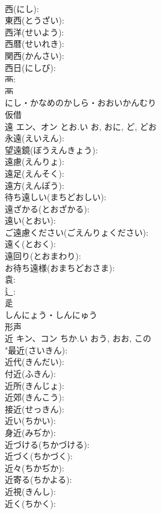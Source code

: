 \documentclass[8pt]{extreport}
\begin{document}
\begin{CJK}{UTF8}{min}
\\	西(にし): 
\\	東西(とうざい): 
\\	西洋(せいよう): 
\\	西暦(せいれき): 
\\	関西(かんさい): 
\\	西日(にしび): 
\\	襾: 
\\	襾	
\\	にし・かなめのかしら・おおいかんむり	
\\	仮借 
\\	遠	エン、オン	とお.い	お, おに, ど, どお	
\\	永遠(えいえん): 
\\	望遠鏡(ぼうえんきょう): 
\\	遠慮(えんりょ): 
\\	遠足(えんそく): 
\\	遠方(えんぽう): 
\\	待ち遠しい(まちどおしい): 
\\	遠ざかる(とおざかる): 
\\	遠い(とおい): 
\\	ご遠慮ください(ごえんりょください): 
\\	遠く(とおく): 
\\	遠回り(とおまわり): 
\\	お待ち遠様(おまちどおさま): 
\\	袁: 
\\	辶: 
\\	辵	
\\	しんにょう・しんにゅう	
\\	形声 
\\	近	キン、コン	ちか.い	おう, おお, この	
\\	"最近(さいきん): 
\\	近代(きんだい): 
\\	付近(ふきん): 
\\	近所(きんじょ): 
\\	近郊(きんこう): 
\\	接近(せっきん): 
\\	近い(ちかい): 
\\	身近(みぢか): 
\\	近づける(ちかづける): 
\\	近づく(ちかづく): 
\\	近々(ちかぢか): 
\\	近寄る(ちかよる): 
\\	近視(きんし): 
\\	近く(ちかく): 

\end{CJK}
\end{document}

